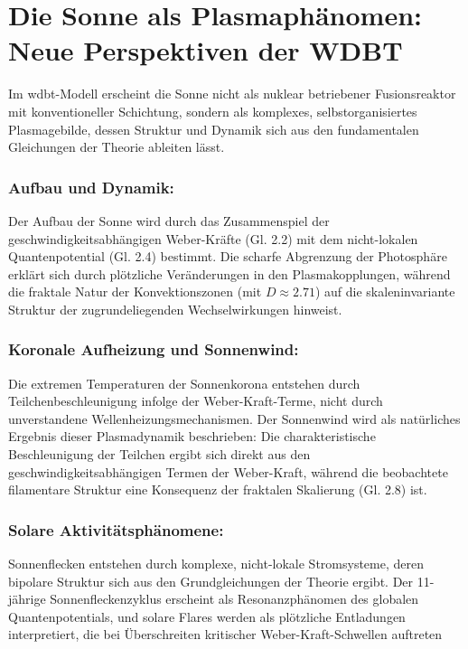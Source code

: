 \section{Die Sonne als Plasmaphänomen: Neue Perspektiven der WDBT}
Im \gls{wdbt}-Modell erscheint die Sonne nicht als nuklear betriebener Fusionsreaktor mit konventioneller Schichtung, sondern als komplexes, selbstorganisiertes Plasmagebilde, dessen Struktur und
Dynamik sich aus den fundamentalen Gleichungen der Theorie ableiten lässt.

\subsubsection{Aufbau und Dynamik:}
Der Aufbau der Sonne wird durch das Zusammenspiel der geschwindigkeitsabhängigen Weber-Kräfte (Gl. 2.2) mit dem nicht-lokalen Quantenpotential (Gl. 2.4) bestimmt. Die scharfe Abgrenzung der Photosphäre
erklärt sich durch plötzliche Veränderungen in den Plasmakopplungen, während die fraktale Natur der Konvektionszonen (mit $D \approx 2.71$) auf die skaleninvariante Struktur der zugrundeliegenden
Wechselwirkungen hinweist.

\subsubsection{Koronale Aufheizung und Sonnenwind:}
Die extremen Temperaturen der Sonnenkorona entstehen durch Teilchenbeschleunigung infolge der Weber-Kraft-Terme, nicht durch unverstandene Wellenheizungsmechanismen. Der Sonnenwind wird als natürliches
Ergebnis dieser Plasmadynamik beschrieben: Die charakteristische Beschleunigung der Teilchen ergibt sich direkt aus den geschwindigkeitsabhängigen Termen der Weber-Kraft, während die beobachtete
filamentare Struktur eine Konsequenz der fraktalen Skalierung (Gl. 2.8) ist.

\subsubsection{Solare Aktivitätsphänomene:}
Sonnenflecken entstehen durch komplexe, nicht-lokale Stromsysteme, deren bipolare Struktur sich aus den Grundgleichungen der Theorie ergibt. Der 11-jährige Sonnenfleckenzyklus erscheint als
Resonanzphänomen des globalen Quantenpotentials, und solare Flares werden als plötzliche Entladungen interpretiert, die bei Überschreiten kritischer Weber-Kraft-Schwellen auftreten


